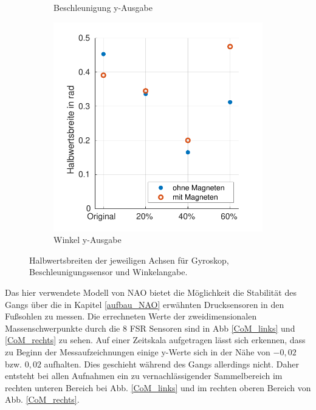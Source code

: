 \begin{figure}[tb!]
\begin{adjustwidth}{-0.1\linewidth}{-0.1\linewidth}
\begin{subfigure}[c]{.32\linewidth}
			\caption{Beschleunigung y-Ausgabe}
			\vspace{5pt}
		\end{subfigure}
		\hfill
		\begin{subfigure}[c]{.32\linewidth}
			\centering
			\includegraphics[width=\linewidth]{Bilder/fwhm_AngleY.pdf}
			\caption{Winkel y-Ausgabe}
			\vspace{5pt}
		\end{subfigure}
	\end{adjustwidth}
	\caption{Halbwertsbreiten der jeweiligen Achsen für Gyroskop, Beschleunigungssensor und Winkelangabe.} \label{fwhm}
\end{figure}

Das hier verwendete Modell von NAO bietet die Möglichkeit die Stabilität des Gangs über die in Kapitel \ref{aufbau_NAO} erwähnten Drucksensoren in den Fußsohlen zu messen. Die errechneten Werte der zweidimensionalen Massenschwerpunkte durch die 8 FSR Sensoren sind in Abb \ref{CoM_links} und \ref{CoM_rechts} zu sehen. Auf einer Zeitskala aufgetragen lässt sich erkennen, dass zu Beginn der Messaufzeichnungen einige y-Werte sich in der Nähe von $-0,02$ bzw. $0,02$ aufhalten. Dies geschieht während des Gangs allerdings nicht. Daher entsteht bei allen Aufnahmen ein zu vernachlässigender Sammelbereich im rechten unteren Bereich bei Abb. \ref{CoM_links} und im rechten oberen Bereich von Abb. \ref{CoM_rechts}. 

